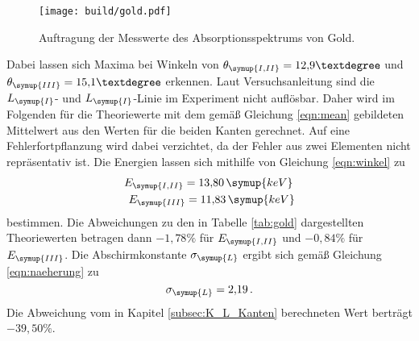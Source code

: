 \begin{figure}
  \centering
  \texttt{[image: build/gold.pdf]}
  \caption{Auftragung der Messwerte des Absorptionsspektrums von Gold.}
  \label{fig:gold}
\end{figure}

Dabei lassen sich Maxima bei Winkeln von $\theta_{\symup{I,II}}=12{,}9°$ und
$\theta_{\symup{III}}=15{,}1°$ erkennen. Laut Versuchsanleitung \cite{Versuchsanleitung}
sind die $L_{\symup{I}}$- und $L_{\symup{I}}$-Linie im Experiment nicht auflösbar.
Daher wird im Folgenden für die Theoriewerte mit dem gemäß Gleichung \eqref{eqn:mean}
gebildeten Mittelwert aus den Werten für die beiden Kanten gerechnet. Auf eine
Fehlerfortpflanzung wird dabei verzichtet, da der Fehler aus zwei Elementen nicht
repräsentativ ist. Die Energien lassen sich mithilfe von Gleichung \eqref{eqn:winkel}
zu
\begin{align*}
  E_{\symup{I,II}}=13{,}80\,\symup{keV} \, \\
  E_{\symup{III}}=11{,}83\,\symup{keV}
\end{align*}
bestimmen.
Die Abweichungen zu den in Tabelle \ref{tab:gold} dargestellten Theoriewerten
betragen dann $-1{,}78\%$ für $E_{\symup{I,II}}$ und $-0{,}84\%$ für $E_{\symup{III}}$.
Die Abschirmkonstante $\sigma_{\symup{L}}$ ergibt sich gemäß Gleichung
\eqref{eqn:naeherung} zu
\begin{equation*}
  \sigma_{\symup{L}}=2{,}19 \,.
\end{equation*}
Die Abweichung vom in Kapitel \ref{subsec:K_L_Kanten} berechneten Wert berträgt
$-39{,}50\%$.
